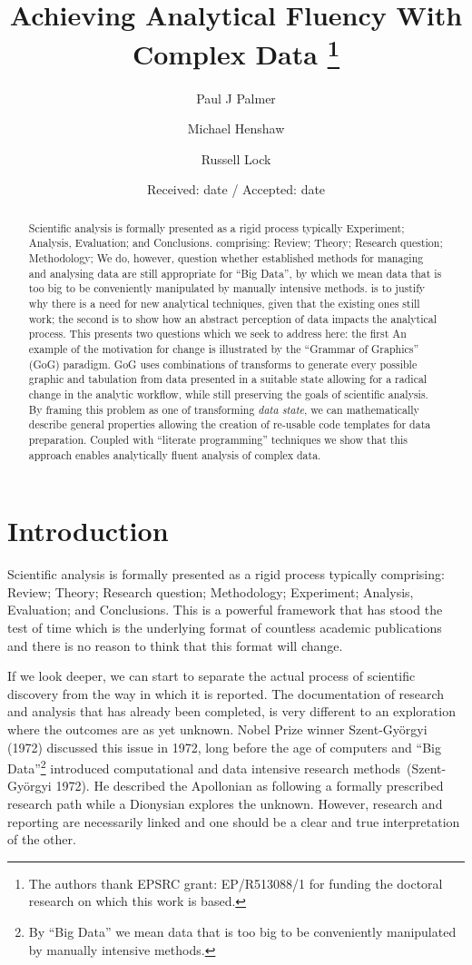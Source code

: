 \documentclass[
]{article}
\title{Achieving Analytical Fluency With Complex Data \footnote{The
  authors thank EPSRC grant: EP/R513088/1 for funding the doctoral
  research on which this work is based.}}
\author{Paul J Palmer \and Michael Henshaw \and Russell Lock}
\date{Received: date / Accepted: date}
\begin{document}
\maketitle
\begin{abstract}
Scientific analysis is formally presented as a rigid process typically
Experiment; Analysis, Evaluation; and Conclusions. comprising: Review;
Theory; Research question; Methodology; We do, however, question whether
established methods for managing and analysing data are still
appropriate for ``Big Data'', by which we mean data that is too big to
be conveniently manipulated by manually intensive methods. is to justify
why there is a need for new analytical techniques, given that the
existing ones still work; the second is to show how an abstract
perception of data impacts the analytical process. This presents two
questions which we seek to address here: the first An example of the
motivation for change is illustrated by the ``Grammar of Graphics''
(GoG) paradigm. GoG uses combinations of transforms to generate every
possible graphic and tabulation from data presented in a suitable state
allowing for a radical change in the analytic workflow, while still
preserving the goals of scientific analysis. By framing this problem as
one of transforming \emph{data state}, we can mathematically describe
general properties allowing the creation of re-usable code templates for
data preparation. Coupled with ``literate programming'' techniques we
show that this approach enables analytically fluent analysis of complex
data.
\end{abstract}

\hypertarget{sec:introduction}{%
\section{Introduction}\label{sec:introduction}}

Scientific analysis is formally presented as a rigid process typically
comprising: Review; Theory; Research question; Methodology; Experiment;
Analysis, Evaluation; and Conclusions. This is a powerful framework that
has stood the test of time which is the underlying format of countless
academic publications and there is no reason to think that this format
will change.

If we look deeper, we can start to separate the actual process of
scientific discovery from the way in which it is reported. The
documentation of research and analysis that has already been completed,
is very different to an exploration where the outcomes are as yet
unknown. Nobel Prize winner Szent-Györgyi (1972) discussed this issue in
1972, long before the age of computers and ``Big Data''\footnote{By
  ``Big Data'' we mean data that is too big to be conveniently
  manipulated by manually intensive methods.} introduced computational
and data intensive research methods~(Szent-Györgyi 1972). He described
the Apollonian as following a formally prescribed research path while a
Dionysian explores the unknown. However, research and reporting are
necessarily linked and one should be a clear and true interpretation of
the other.
\end{document}

